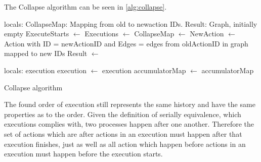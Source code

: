 	The Collapse algorithm can be seen in \autoref{alg:collapse}.
	
	\begin{algorithm}
		\begin{algorithmic}
			\State
				locals: CollapseMap: Mapping from old to newaction IDs.
				\State\hspace{28pt} Result: Graph, initially empty
				\State
				\State ExecuteStarts $\leftarrow$  \State
				Executions $\leftarrow$ 
				\State
					CollapseMap $\leftarrow$ 
				\EndFor
					\State
					NewAction $\leftarrow$ Action with \State\hspace{28pt}ID = newActionID and \State\hspace{28pt}Edges = edges from oldActionID in graph mapped to new IDs\State
					Result $\leftarrow$  \State{}
				\EndFor
				
			\EndFunction
			\State
				\State locals: execution
				 \State
					execution $\leftarrow$ 
				\EndWhile\State
				\Return execution
			\EndFunction
			\State
				\State
					accumulatorMap $\leftarrow$ 
				\EndFor \State
				\Return accumulatorMap
			\EndFunction
		\end{algorithmic}
		\caption{Collapse algorithm}
		\label{alg:collapse}
	\end{algorithm}
	
	The found order of execution still represents the same history and have the same properties as to the order. Given the definition of serially equivalence, which executions complies with, two processes happen after one another. Therefore the set of actions which are after actions in an execution must happen after that execution finishes, just as well as all action which happen before actions in an execution must happen before the execution starts. 

